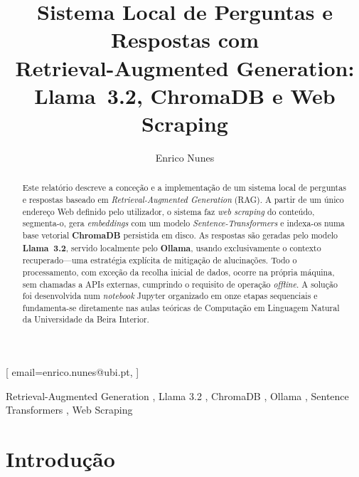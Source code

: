 \documentclass[]{ceurart}
\begin{document}


\title{Sistema Local de Perguntas e Respostas com \\ Retrieval-Augmented Generation: Llama~3.2, ChromaDB e Web Scraping}

\author{Enrico Nunes}[%
  email=enrico.nunes@ubi.pt,
]
\address{Universidade da Beira Interior, Covilhã, Portugal}

\begin{abstract}
Este relatório descreve a conceção e a implementação de um sistema local de
perguntas e respostas baseado em \emph{Retrieval-Augmented Generation} (RAG).
A partir de um único endereço Web definido pelo utilizador, o sistema faz
\emph{web scraping} do conteúdo, segmenta-o, gera \emph{embeddings} com um modelo
\emph{Sentence-Transformers} e indexa-os numa base vetorial \textbf{ChromaDB}
persistida em disco. As respostas são geradas pelo modelo \textbf{Llama~3.2},
servido localmente pelo \textbf{Ollama}, usando exclusivamente o contexto
recuperado---uma estratégia explícita de mitigação de alucinações. Todo o
processamento, com exceção da recolha inicial de dados, ocorre na própria
máquina, sem chamadas a APIs externas, cumprindo o requisito de operação
\emph{offline}. A solução foi desenvolvida num \emph{notebook} Jupyter organizado
em onze etapas sequenciais e fundamenta-se diretamente nas aulas teóricas de
Computação em Linguagem Natural da Universidade da Beira Interior.
\end{abstract}

\begin{keywords}
  Retrieval-Augmented Generation \sep
  Llama 3.2 \sep
  ChromaDB \sep
  Ollama \sep
  Sentence Transformers \sep
  Web Scraping
\end{keywords}

\maketitle

\section{Introdução}
\end{document}
